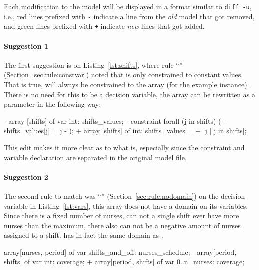 \documentclass[a4paper,12pt]{article}
\newcommand{\ruleref}[1]{``\nameref{sec:rule:#1}'' (Section~\ref{sec:rule:#1})}
\begin{document}
Each modification to the model will be displayed in a format similar to \texttt{diff -u},
i.e., red lines prefixed with \texttt{-} indicate a line from the \emph{old} model that
got removed, and green lines prefixed with \texttt{+} indicate \emph{new} lines that got added.

\paragraph{Suggestion 1}
\begin{sloppypar}
The first suggestion is on Listing~\ref{lst:shifts}, where rule \ruleref{constvar} noted
that  is only constrained to constant values. That is true,
 will always be constrained to the array \mi{[1,2,3]} (for the example instance).
There is no need for this to be a decision variable, the array can be rewritten as a parameter in the following way:
\end{sloppypar}
\begin{mznnobreak}[style=diff]
- array [shifts] of var int: shifts_values;
- constraint forall (j in shifts) (
-   shifts_values[j] = j
- );
+ array [shifts] of int: shifts_values =
+   [j | j in shifts];
\end{mznnobreak}
This edit makes it more clear as to what  is, especially since the
constraint and variable declaration are separated in the original model file.

\paragraph{Suggestion 2}
The second rule to match was \ruleref{nodomain} on the decision variable  in
Listing~\ref{lst:vars}, this array does not have a domain on its variables. Since there is
a fixed number of nurses, can not a single shift ever have more nurses than the maximum, there also
can not be a negative amount of nurses assigned to a shift.  has in fact the
same domain as .
\begin{mznnobreak}[style=diff]
array[nurses, period] of var shifts_and_off: nurses_schedule;
- array[period, shifts] of var int: coverage;
+ array[period, shifts] of var 0..n_nurses: coverage;
\end{mznnobreak}
\end{document}
